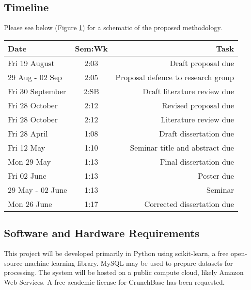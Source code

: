 \documentclass[12pt, a4paper]{article}
\begin{document}
\subsection*{Timeline}

Please see below (Figure \ref{tab:timeline}) for a schematic of the proposed methodology.

\begin{table}[!hbp]
  \centering
    \begin{tabular}{l|c|r}
    \toprule
    \textbf{Date} & \textbf{Sem:Wk} & \textbf{Task} \\
    \midrule
    Fri 19 August & {2:03} & Draft proposal due \\
    29 Aug - 02 Sep & {2:05} & Proposal defence to research group \\
    Fri 30 September & {2:SB} & Draft literature review due \\
    Fri 28 October & {2:12} & Revised proposal due \\
    Fri 28 October & {2:12} & Literature review due \\
    Fri 28 April & {1:08} & Draft dissertation due \\
    Fri 12 May & {1:10} & Seminar title and abstract due \\
    Mon 29 May & {1:13} & Final dissertation due \\
    Fri 02 June & {1:13} & Poster due \\
    29 May - 02 June & {1:13} & Seminar \\
    Mon 26 June & {1:17} & Corrected dissertation due \\
    \bottomrule
    \end{tabular}%
  \label{tab:timeline}%
\end{table}%

\subsection*{Software and Hardware Requirements}

This project will be developed primarily in Python using scikit-learn, a free open-source machine learning library. MySQL may be used to prepare datasets for processing. The system will be hosted on a public compute cloud, likely Amazon Web Services. A free academic license for CrunchBase has been requested.
\end{document}
